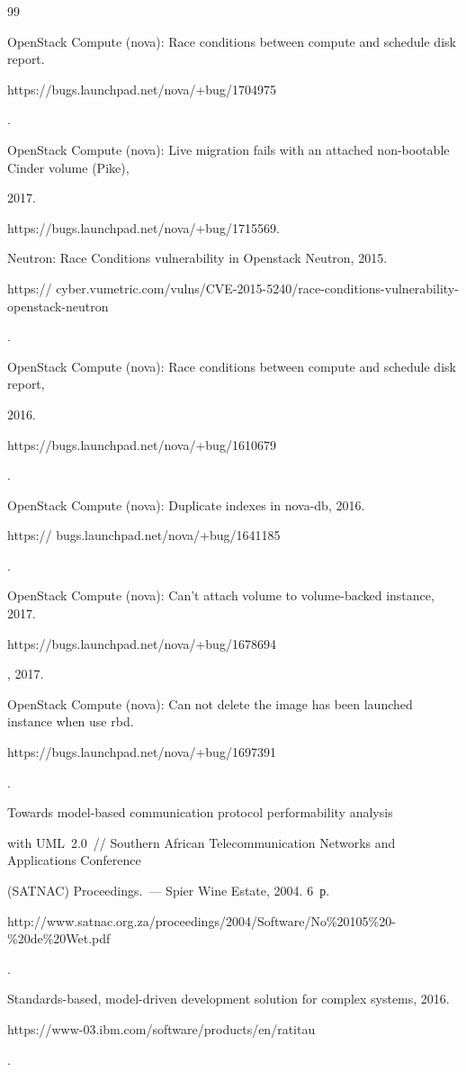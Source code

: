 {{\begin{thebibliography}{99}


OpenStack Compute (nova): Race conditions between compute and schedule disk report. {\sf 


https://bugs.launchpad.net/nova/+bug/1704975}.




OpenStack Compute (nova): Live migration fails with an attached non-bootable Cinder volume (Pike),


2017. 


{\sf https://bugs.launchpad.net/nova/+bug/1715569}. 




Neutron: Race Conditions vulnerability in Openstack Neutron, 2015. {\sf  


https:// cyber.vumetric.com/vulns/CVE-2015-5240/race-conditions-vulnerability-openstack-neutron}.




OpenStack Compute (nova): Race conditions between compute and schedule disk report,


2016. {\sf 


https://bugs.launchpad.net/nova/+bug/1610679}.




OpenStack Compute (nova): Duplicate indexes in nova-db, 2016. {\sf 


https:// bugs.launchpad.net/nova/+bug/1641185}.




OpenStack Compute (nova): Can't attach volume to volume-backed instance, 2017. {\sf 


https://bugs.launchpad.net/nova/+bug/1678694}, 2017.




OpenStack Compute (nova): Can not delete the image has been launched instance when use rbd. {\sf 


https://bugs.launchpad.net/nova/+bug/1697391}.




 Towards model-based communication protocol performability analysis 


with UML~2.0~/\!\!/ Southern African Telecommunication Networks and Applications Conference 


(SATNAC) Proceedings.~--- Spier Wine Estate, 2004. 6~р. {\sf 


http://www.satnac.org.za/proceedings/2004/Software/No\%20105\%20-\%20de\%20Wet.pdf}.




Standards-based, model-driven development solution for complex systems, 2016. {\sf  


https://www-03.ibm.com/software/products/en/ratitau}.





        \end{thebibliography}


} }








